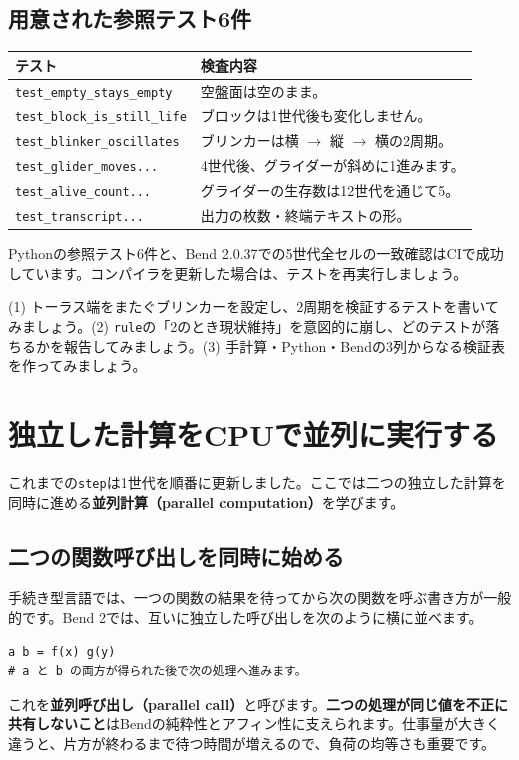 \documentclass[11pt,a4paper,openany]{book}
\newcommand{\code}[1]{\texttt{#1}}
\newcommand{\term}[1]{\textbf{#1}}
\newcommand{\exercise}[1]{\begin{exercisebox}#1\end{exercisebox}}
\begin{document}
\section{用意された参照テスト6件}
\begin{tabularx}{\linewidth}{@{}p{49mm}X@{}}
\toprule
テスト & 検査内容\\
\midrule
\code{test\_empty\_stays\_empty} & 空盤面は空のまま。\\
\code{test\_block\_is\_still\_life} & ブロックは1世代後も変化しません。\\
\code{test\_blinker\_oscillates} & ブリンカーは横 $\rightarrow$ 縦 $\rightarrow$ 横の2周期。\\
\code{test\_glider\_moves...} & 4世代後、グライダーが斜めに1進みます。\\
\code{test\_alive\_count...} & グライダーの生存数は12世代を通じて5。\\
\code{test\_transcript...} & 出力の枚数・終端テキストの形。\\
\bottomrule
\end{tabularx}

\begin{pointbox}
Pythonの参照テスト6件と、Bend 2.0.37での5世代全セルの一致確認はCIで成功しています。コンパイラを更新した場合は、テストを再実行しましょう。
\end{pointbox}

\exercise{(1) トーラス端をまたぐブリンカーを設定し、2周期を検証するテストを書いてみましょう。(2) \code{rule}の「2のとき現状維持」を意図的に崩し、どのテストが落ちるかを報告してみましょう。(3) 手計算・Python・Bendの3列からなる検証表を作ってみましょう。}


\chapter{独立した計算をCPUで並列に実行する}
\begin{tcolorbox}[colback=blue!3,colframe=blue!16,boxrule=.35pt,arc=1mm,left=3mm,right=3mm,top=2mm,bottom=2mm]
\small これまでの\code{step}は1世代を順番に更新しました。ここでは二つの独立した計算を同時に進める\term{並列計算（parallel computation）}を学びます。
\end{tcolorbox}

\section{二つの関数呼び出しを同時に始める}
手続き型言語では、一つの関数の結果を待ってから次の関数を呼ぶ書き方が一般的です。Bend 2では、互いに独立した呼び出しを次のように横に並べます。
\begin{lstlisting}[caption={二つの独立した呼び出し}]
a b = f(x) g(y)
# a と b の両方が得られた後で次の処理へ進みます。
\end{lstlisting}
これを\term{並列呼び出し（parallel call）}と呼びます。\textbf{二つの処理が同じ値を不正に共有しないこと}はBendの純粋性とアフィン性に支えられます。仕事量が大きく違うと、片方が終わるまで待つ時間が増えるので、負荷の均等さも重要です。
\end{document}
